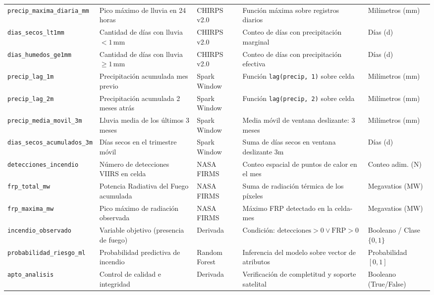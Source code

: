 \documentclass[11pt,a4paper]{article}
\begin{document}
\begin{table}[H]
\begin{tabularx}{\textwidth}{@{}L{3.2cm}L{4.2cm}L{2.5cm}X C{2.2cm}@{}}
\texttt{precip\_maxima\_diaria\_mm} & Pico m\'aximo de lluvia en 24 horas & CHIRPS v2.0 & Funci\'on m\'axima sobre registros diarios & Mil\'imetros (mm) \\
\texttt{dias\_secos\_lt1mm} & Cantidad de d\'ias con lluvia $<1$\,mm & CHIRPS v2.0 & Conteo de d\'ias con precipitaci\'on marginal & D\'ias (d) \\
\texttt{dias\_humedos\_ge1mm} & Cantidad de d\'ias con lluvia $\ge 1$\,mm & CHIRPS v2.0 & Conteo de d\'ias con precipitaci\'on efectiva & D\'ias (d) \\
\texttt{precip\_lag\_1m} & Precipitaci\'on acumulada mes previo & Spark Window & Funci\'on \texttt{lag(precip, 1)} sobre celda & Mil\'imetros (mm) \\
\texttt{precip\_lag\_2m} & Precipitaci\'on acumulada 2 meses atr\'as & Spark Window & Funci\'on \texttt{lag(precip, 2)} sobre celda & Mil\'imetros (mm) \\
\texttt{precip\_media\_movil\_3m} & Lluvia media de los \'ultimos 3 meses & Spark Window & Media m\'ovil de ventana deslizante: 3 meses & Mil\'imetros (mm) \\
\texttt{dias\_secos\_acumulados\_3m} & D\'ias secos en el trimestre m\'ovil & Spark Window & Suma de d\'ias secos en ventana deslizante 3m & D\'ias (d) \\
\texttt{detecciones\_incendio} & N\'umero de detecciones VIIRS en celda & NASA FIRMS & Conteo espacial de puntos de calor en el mes & Conteo adim. (N) \\
\texttt{frp\_total\_mw} & Potencia Radiativa del Fuego acumulada & NASA FIRMS & Suma de radiaci\'on t\'ermica de los p\'ixeles & Megavatios (MW) \\
\texttt{frp\_maxima\_mw} & Pico m\'aximo de radiaci\'on observada & NASA FIRMS & M\'aximo FRP detectado en la celda-mes & Megavatios (MW) \\
\texttt{incendio\_observado} & Variable objetivo (presencia de fuego) & Derivada & Condici\'on: $\text{detecciones} > 0 \lor \text{FRP} > 0$ & Booleano / Clase $\{0,1\}$ \\
\texttt{probabilidad\_riesgo\_ml} & Probabilidad predictiva de incendio & Random Forest & Inferencia del modelo sobre vector de atributos & Probabilidad $[0, 1]$ \\
\texttt{apto\_analisis} & Control de calidad e integridad & Derivada & Verificaci\'on de completitud y soporte satelital & Booleano (True/False) \\
\bottomrule
\end{tabularx}
\end{table}
\end{document}
